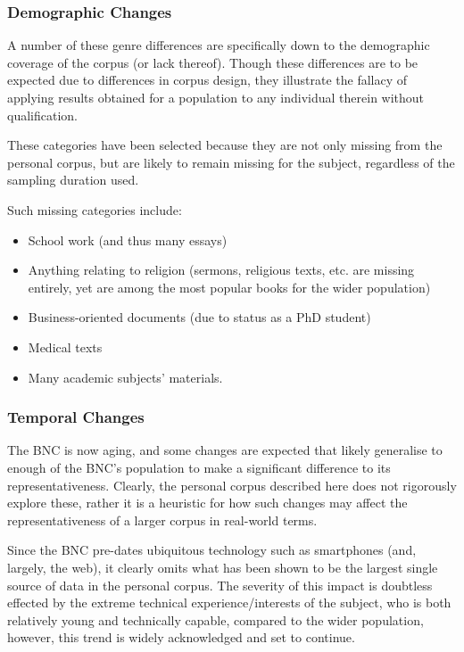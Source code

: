 \subsubsection{Demographic Changes}
A number of these genre differences are specifically down to the demographic coverage of the corpus (or lack thereof).  Though these differences are to be expected due to differences in corpus design, they illustrate the fallacy of applying results obtained for a population to any individual therein without qualification.

These categories have been selected because they are not only missing from the personal corpus, but are likely to remain missing for the subject, regardless of the sampling duration used.

Such missing categories include:
\begin{itemize}
    \item School work (and thus many essays)
    \item Anything relating to religion (sermons, religious texts, etc. are missing entirely, yet are among the most popular books for the wider population)
    \item Business-oriented documents (due to status as a PhD student)
    \item Medical texts
    \item Many academic subjects' materials.
\end{itemize}


%






\subsubsection{Temporal Changes}
The BNC is now aging, and some changes are expected that likely generalise to enough of the BNC's population to make a significant difference to its representativeness.  Clearly, the personal corpus described here does not rigorously explore these, rather it is a heuristic for how such changes may affect the representativeness of a larger corpus in real-world terms.


Since the BNC pre-dates ubiquitous technology such as smartphones (and, largely, the web), it clearly omits what has been shown to be the largest single source of data in the personal corpus.  The severity of this impact is doubtless effected by the extreme technical experience/interests of the subject, who is both relatively young and technically capable, compared to the wider population, however, this trend is widely acknowledged and set to continue.

